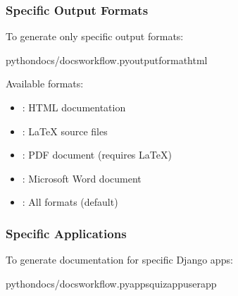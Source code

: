 \documentclass[letterpaper,10pt,english]{sphinxmanual}
\begin{document}
\subsubsection{Specific Output Formats}
\label{\detokenize{documentation_workflow:specific-output-formats}}
\sphinxAtStartPar
To generate only specific output formats:

\begin{sphinxVerbatim}[commandchars=\\\{\}]
pythondocs/docs\PYGZus{}workflow.py\PYGZhy{}\PYGZhy{}output\PYGZhy{}formathtml
\end{sphinxVerbatim}

\sphinxAtStartPar
Available formats:
\begin{itemize}
\item {} 
\sphinxAtStartPar
{}: HTML documentation

\item {} 
\sphinxAtStartPar
{}: LaTeX source files

\item {} 
\sphinxAtStartPar
{}: PDF document (requires LaTeX)

\item {} 
\sphinxAtStartPar
{}: Microsoft Word document

\item {} 
\sphinxAtStartPar
{}: All formats (default)

\end{itemize}


\subsubsection{Specific Applications}
\label{\detokenize{documentation_workflow:specific-applications}}
\sphinxAtStartPar
To generate documentation for specific Django apps:

\begin{sphinxVerbatim}[commandchars=\\\{\}]
pythondocs/docs\PYGZus{}workflow.py\PYGZhy{}\PYGZhy{}appsquiz\PYGZus{}appuser\PYGZus{}app
\end{sphinxVerbatim}
\end{document}
